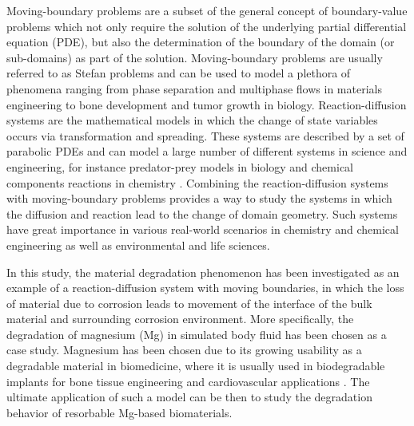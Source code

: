 Moving-boundary problems \cite{Crank1987} are a subset of the general concept of boundary-value problems which not only require the solution of the underlying partial differential equation (\gls{PDE}), but also the determination of the boundary of the domain (or sub-domains) as part of the solution.  Moving-boundary problems are usually referred to as Stefan problems \cite{Crank1987} and can be used to model a plethora of phenomena ranging from phase separation and multiphase flows in materials engineering to bone development and tumor growth in biology. Reaction-diffusion systems are the  mathematical models in which the change of state variables occurs via transformation and spreading. These systems are described by a set of parabolic \gls{PDE}s and can model a large number of different systems in science and engineering, for instance predator-prey models in biology and chemical components reactions in chemistry \cite{Grindrod1996}. Combining the reaction-diffusion systems with moving-boundary problems provides a way to study the systems in which the diffusion and reaction lead to the change of domain geometry. Such systems have great importance in various real-world scenarios in chemistry and chemical engineering as well as environmental and life sciences.


In this study, the material degradation phenomenon has been investigated as an example of a reaction-diffusion system with moving boundaries, in which the loss of material due to corrosion leads to movement of the interface of the bulk material and surrounding corrosion environment. More specifically, the degradation of magnesium (Mg) in simulated body fluid has been chosen as a case study. Magnesium has been chosen due to its growing usability as a degradable material in biomedicine, where it is usually used in  biodegradable implants for bone tissue engineering and cardiovascular applications \cite{Chen2014,Zhao2017}. The ultimate application of such a model can be then to study the degradation behavior of resorbable Mg-based biomaterials.

